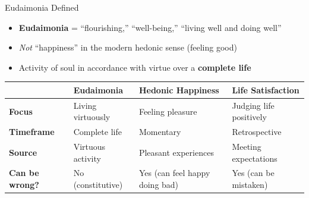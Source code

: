 ﻿\documentclass[aspectratio=169,11pt]{beamer}
\begin{document}
\begin{frame}{Eudaimonia Defined}
\begin{itemize}
    \item \textbf{Eudaimonia} = ``flourishing,'' ``well-being,'' ``living well and doing well''
    \item \textit{Not} ``happiness'' in the modern hedonic sense (feeling good)
    \item Activity of soul in accordance with virtue over a \textbf{complete life}
\end{itemize}

\vspace{0.3cm}
\begin{table}[h]
\centering
\small
\begin{tabular}{>{\bfseries}l p{3.5cm} p{3.5cm} p{3.5cm}}
\toprule
& \textbf{Eudaimonia} & \textbf{Hedonic Happiness} & \textbf{Life Satisfaction} \\
\midrule
Focus & Living virtuously & Feeling pleasure & Judging life positively \\
Timeframe & Complete life & Momentary & Retrospective \\
Source & Virtuous activity & Pleasant experiences & Meeting expectations \\
Can be wrong? & No (constitutive) & Yes (can feel happy doing bad) & Yes (can be mistaken) \\
\bottomrule
\end{tabular}
\end{table}
\end{frame}
\end{document}
